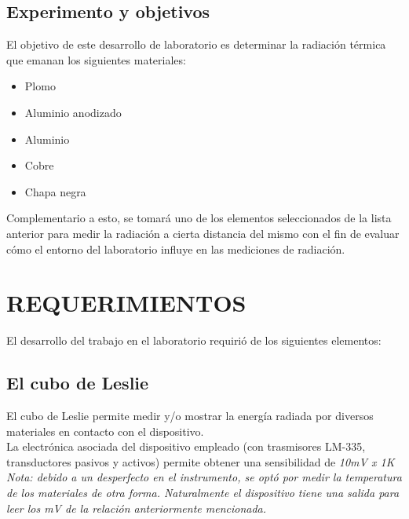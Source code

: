 \documentclass[a4paper]{article}
\begin{document}
    \vspace{4.8cm}
    \subsection{Experimento y objetivos}
        \indent El objetivo de este desarrollo de laboratorio es determinar la radiación térmica que emanan los siguientes materiales: \\
        \begin{itemize}
            \setlength{\itemsep}{0pt}
            \item Plomo 
            \item Aluminio anodizado
            \item Aluminio
            \item Cobre 
            \item Chapa negra
        \end{itemize}
        
        \indent Complementario a esto, se tomará uno de los elementos seleccionados de la lista anterior para medir la radiación a cierta distancia del mismo con el fin de evaluar cómo el entorno del laboratorio influye en las mediciones de radiación. \\

     \section{REQUERIMIENTOS}
        El desarrollo del trabajo en el laboratorio requirió de los siguientes elementos:
        \subsection{El cubo de Leslie}
            \indent El cubo de Leslie permite medir y/o mostrar la energía radiada por diversos materiales en contacto con el dispositivo. \\
            \indent La electrónica asociada del dispositivo empleado (con trasmisores LM-335, transductores pasivos y activos) permite obtener una sensibilidad de \textit{10mV x 1\textdegree K} \\
            \indent \textit{Nota: debido a un desperfecto en el instrumento, se optó por medir la temperatura de los materiales de otra forma. Naturalmente el dispositivo tiene una salida para leer los mV de la relación anteriormente mencionada.}
\end{document}
